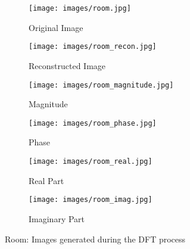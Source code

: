 \begin{figure}[htbp]
    \centering 
    \begin{minipage}{0.8\textwidth} 
        \centering 
        
        \begin{subfigure}[b]{0.45\linewidth} 
            \texttt{[image: images/room.jpg]}
            \caption{Original Image}
        \end{subfigure}
        \hfill
        \begin{subfigure}[b]{0.45\linewidth}
            \texttt{[image: images/room\_recon.jpg]}
            \caption{Reconstructed Image}
        \end{subfigure}

        \vspace{0.5cm}
        \begin{subfigure}[b]{0.45\linewidth}
            \texttt{[image: images/room\_magnitude.jpg]}
            \caption{Magnitude}
        \end{subfigure}
        \hfill
        \begin{subfigure}[b]{0.45\linewidth}
            \texttt{[image: images/room\_phase.jpg]}
            \caption{Phase}
        \end{subfigure}

        \vspace{0.5cm}
        \begin{subfigure}[b]{0.45\linewidth}
            \texttt{[image: images/room\_real.jpg]}
            \caption{Real Part}
        \end{subfigure}
        \hfill
        \begin{subfigure}[b]{0.45\linewidth}
            \texttt{[image: images/room\_imag.jpg]}
            \caption{Imaginary Part}
        \end{subfigure}

        \caption{Room: Images generated during the DFT process}
        \label{fig:room}
    \end{minipage}
\end{figure}


